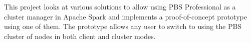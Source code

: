 This project looks at various solutions to allow using PBS Professional as a cluster manager in Apache Spark and implements a proof-of-concept prototype using one of them. The prototype allows any user to switch to using the PBS cluster of nodes in both client and cluster modes.
